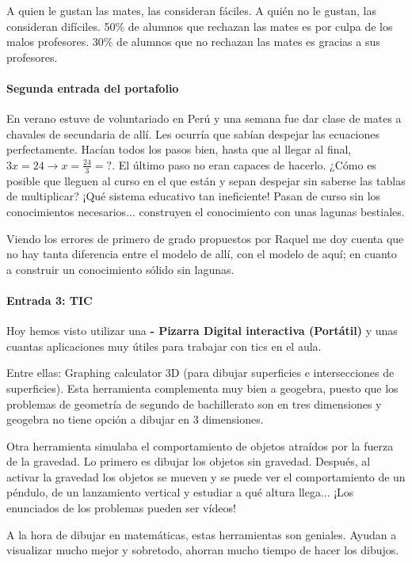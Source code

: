 \documentclass[palatino,nochap,miniheader]{apuntesURJC}
\begin{document}
A quien le gustan las mates, las consideran fáciles. A quién no le gustan, las consideran difíciles. 50\% de alumnos que rechazan las mates es por culpa de los malos profesores. 30\% de alumnos que no rechazan las mates es gracias a sus profesores. 


\paragraph{Segunda entrada del portafolio}


En verano estuve de voluntariado en Perú y una semana fue dar clase de mates a chavales de secundaria de allí. 
%
Les ocurría que sabían despejar las ecuaciones perfectamente. Hacían todos los pasos bien, hasta que al llegar al final, $3x = 24 \to x=\frac{24}{3} = ?$. 
%
El último paso no eran capaces de hacerlo. ¿Cómo es posible que lleguen al curso en el que están y sepan despejar sin saberse las tablas de multiplicar? 
%
¡Qué sistema educativo tan ineficiente! 
%
Pasan de curso sin los conocimientos necesarios... construyen el conocimiento con unas lagunas bestiales.

Viendo los errores de primero de grado propuestos por Raquel me doy cuenta que no hay tanta diferencia entre el modelo de allí, con el modelo de aquí; 
%
en cuanto a construir un conocimiento sólido sin lagunas.

\paragraph{Entrada 3: TIC}

Hoy hemos visto utilizar una \textbf{ - Pizarra Digital interactiva (Portátil)} y unas cuantas aplicaciones muy útiles para trabajar con tics en el aula.

Entre ellas: Graphing calculator 3D (para dibujar superficies e intersecciones de superficies).
%
Esta herramienta complementa muy bien a geogebra, puesto que los problemas de geometría de segundo de bachillerato son en tres dimensiones y geogebra no tiene opción a dibujar en 3 dimensiones.

Otra herramienta simulaba el comportamiento de objetos atraídos por la fuerza de la gravedad. 
%
Lo primero es dibujar los objetos sin gravedad. Después, al activar la gravedad los objetos se mueven y se puede ver el comportamiento de un péndulo, de un lanzamiento vertical y estudiar a qué altura llega... ¡Los enunciados de los problemas pueden ser vídeos!

A la hora de dibujar en matemáticas, estas herramientas son geniales. Ayudan a visualizar mucho mejor y sobretodo, ahorran mucho tiempo de hacer los dibujos.
\end{document}
